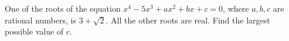 One of the roots of the equation $x^4-5x^3+ax^2+bx+c=0$, where $a,b,c$ are rational numbers, is $3+\sqrt2$. All the other roots are real. Find the largest possible value of $c$.
